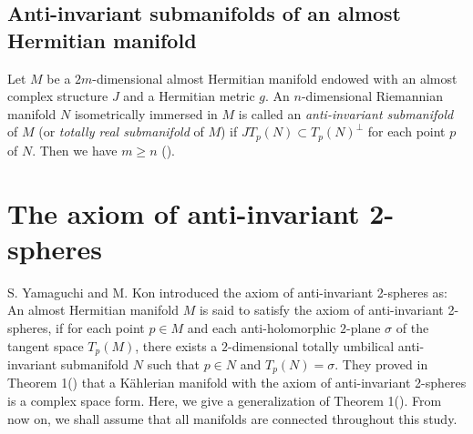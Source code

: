 \documentclass{amsart}
\newtheorem*{theorem A}{Theorem A}
\newtheorem*{theorem B}{N\"olker's Theorem}
\theoremstyle{remark}
\theoremstyle{remark}
\theoremstyle{definition}
\numberwithin{equation}{section}
\begin{document}
\subsection{Anti-invariant submanifolds of an almost Hermitian manifold}

Let $M$ be a $2m$-dimensional almost Hermitian manifold endowed with
an almost complex structure $J$ and a Hermitian metric $g.$ An
$n$-dimensional Riemannian manifold $N$ isometrically immersed in
$M$ is called an \emph{anti-invariant submanifold} of $M$ (or
\emph{totally real submanifold} of $M$) if $JT_{p}(N)\subset
T_{p}(N)^{\bot}$ for each point $p$ of  $N$. Then we have $m\geq n$
(\cite{Yan}).
\section{The axiom of anti-invariant 2-spheres}
S. Yamaguchi and M. Kon \cite{Yama} introduced the axiom of
anti-invariant 2-spheres as: An almost Hermitian manifold $M$ is
said to satisfy the axiom of anti-invariant 2-spheres, if for each
point $p\in M$ and each anti-holomorphic $2$-plane $\sigma$ of the
tangent space $T_{p}(M)$, there exists a $2$-dimensional totally
umbilical anti-invariant submanifold $N$ such that $p\in N$ and
$T_{p}(N)=\sigma.$ They proved in Theorem 1(\cite{Yama}) that a
K\"{a}hlerian manifold with the axiom of anti-invariant 2-spheres is
a complex space form. Here, we give a generalization of Theorem
1(\cite{Yama}). From now on, we shall assume that all manifolds are
connected throughout this study.\\
\end{document}
